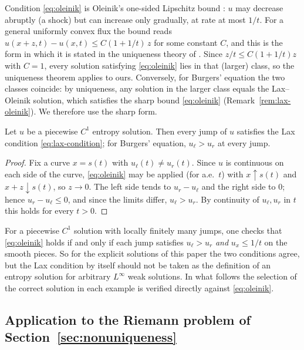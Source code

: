 \noindent Condition \eqref{eq:oleinik} is Oleinik's one-sided Lipschitz
bound \cite{oleinik1957}: $u$ may decrease abruptly (a shock) but can increase only
gradually, at rate at most $1/t$. For a general uniformly convex flux the
bound reads $u(x+z,t)-u(x,t)\le C(1+1/t)\,z$ for some constant $C$, and
this is the form in which it is stated in the uniqueness theory of
\cite[\S3.4]{evans2010}. Since $z/t\le C(1+1/t)z$ with $C=1$, every
solution satisfying \eqref{eq:oleinik} lies in that (larger) class, so the
uniqueness theorem applies to ours. Conversely, for Burgers' equation the
two classes coincide: by uniqueness, any solution in the larger class equals
the Lax--Oleinik solution, which satisfies the sharp bound
\eqref{eq:oleinik} (Remark~\ref{rem:lax-oleinik}). We therefore use the
sharp form.
\begin{lemma}
\label{lem:oleinik-lax}
Let $u$ be a piecewise $C^1$ entropy solution. Then every jump of $u$
satisfies the Lax condition \eqref{eq:lax-condition}; for Burgers'
equation, $u_\ell>u_r$ at every jump.
\end{lemma}

\begin{proof}
Fix a curve $x=s(t)$ with $u_\ell(t)\ne u_r(t)$. Since $u$ is continuous
on each side of the curve, \eqref{eq:oleinik} may be applied (for a.e.\ $t$) with $x
\uparrow s(t)$ and $x+z\downarrow s(t)$, so $z\to0$. The left side tends
to $u_r-u_\ell$ and the right side to $0$; hence $u_r-u_\ell\le0$, and
since the limits differ, $u_\ell>u_r$. By continuity of
$u_\ell,u_r$ in $t$ this holds for every $t>0$.
\end{proof}

\begin{remark}[Scope]
\label{rem:lax-vs-oleinik}
For a piecewise $C^1$ solution with locally finitely many jumps, one
checks that \eqref{eq:oleinik} holds if and only if each jump satisfies
$u_\ell>u_r$ \emph{and} $u_x\le 1/t$ on the smooth pieces. So for the
explicit solutions of this paper the two conditions agree, but the Lax
condition by itself should not be taken as the definition of an entropy
solution for arbitrary $L^\infty$ weak solutions. In what follows the
selection of the correct solution in each example is verified directly
against \eqref{eq:oleinik}.
\end{remark}

\subsection{Application to the Riemann problem of Section~\ref{sec:nonuniqueness}}
\label{subsec:entropy-application}

